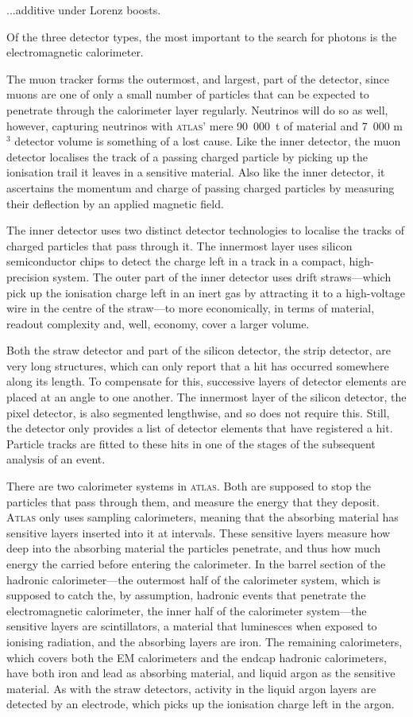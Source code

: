 ...additive under Lorenz boosts.

Of the three detector types, the most important to the search for photons is the electromagnetic calorimeter.

The muon tracker forms the outermost, and largest, part of the detector, since muons are one of only a small number of particles that can be expected to penetrate through the calorimeter layer regularly. Neutrinos will do so as well, however, capturing neutrinos with \textsc{atlas}' mere 90~000~t of material and 7~000 m$^3$ detector volume \cite{atlasweb} is something of a lost cause. Like the inner detector, the muon detector localises the track of a passing charged particle by picking up the ionisation trail it leaves in a sensitive material. Also like the inner detector, it ascertains the momentum and charge of passing charged particles by measuring their deflection by an applied magnetic field.

The inner detector uses two distinct detector technologies to localise the tracks of charged particles that pass through it. The innermost layer uses silicon semiconductor chips to detect the charge left in a track in a compact, high-precision system. The outer part of the inner detector uses drift straws---which pick up the ionisation charge left in an inert gas by attracting it to a high-voltage wire in the centre of the straw---to more economically, in terms of material, readout complexity and, well, economy, cover a larger volume.

Both the straw detector and part of the silicon detector, the strip detector, are very long structures, which can only report that a hit has occurred somewhere along its length. To compensate for this, successive layers of detector elements are placed at an angle to one another. The innermost layer of the silicon detector, the pixel detector, is also segmented lengthwise, and so does not require this. Still, the detector only provides a list of detector elements that have registered a hit. Particle tracks are fitted to these hits in one of the stages of the subsequent analysis of an event.

There are two calorimeter systems in \textsc{atlas}. Both are supposed to stop the particles that pass through them, and measure the energy that they deposit. \textsc{Atlas} only uses sampling calorimeters, meaning that the absorbing material has sensitive layers inserted into it at intervals. These sensitive layers measure how deep into the absorbing material the particles penetrate, and thus how much energy the carried before entering the calorimeter. In the barrel section of the hadronic calorimeter---the outermost half of the calorimeter system, which is supposed to catch the, by assumption, hadronic events that penetrate the electromagnetic calorimeter, the inner half of the calorimeter system---the sensitive layers are scintillators, a material that luminesces when exposed to ionising radiation, and the absorbing layers are iron. The remaining calorimeters, which covers both the EM calorimeters and the endcap hadronic calorimeters, have both iron and lead as absorbing material, and liquid argon as the sensitive material. As with the straw detectors, activity in the liquid argon layers are detected by an electrode, which picks up the ionisation charge left in the argon.